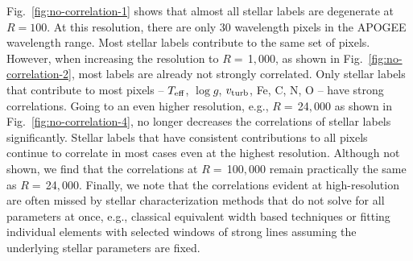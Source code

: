 \documentclass[iop]{emulateapj}
\begin{document}
\begin{CJK*}{UTF8}{gbsn}
Fig.~\ref{fig:no-correlation-1} shows that almost all stellar labels are degenerate at $R=100$. At this resolution, there are only $30$ wavelength pixels in the APOGEE wavelength range. Most stellar labels contribute to the same set of pixels. However, when increasing the resolution to $R = \,$1$,$000, as shown in Fig.~\ref{fig:no-correlation-2}, most labels are already not strongly correlated. Only stellar labels that contribute to most pixels -- $T_{\rm eff}$, $\log g$, $v_{\rm turb}$, Fe, C, N, O -- have strong correlations. Going to an even higher resolution, e.g., $R = \,$24$,$000 as shown in Fig.~\ref{fig:no-correlation-4}, no longer decreases the correlations of stellar labels significantly. Stellar labels that have consistent contributions to all pixels continue to correlate in most cases even at the highest resolution. Although not shown, we find that the correlations at $R = \,$100$,$000 remain practically the same as $R = \,$24$,$000. Finally, we note that the correlations evident at high-resolution are often missed by stellar characterization methods that do not solve for all parameters at once, e.g., classical equivalent width based techniques or fitting individual elements with selected windows of strong lines assuming the underlying stellar parameters are fixed.


%
%
%
%
%
%

\end{CJK*}

\vspace{1cm}


\end{document}
